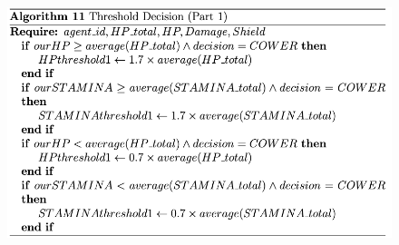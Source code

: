 \begin{figure}[htb]
    \centering
    \includegraphics[scale=0.7]{006_team_3_agent_design/FIGS/Algo11.png}
    \label{fig:algo11}
\end{figure}



